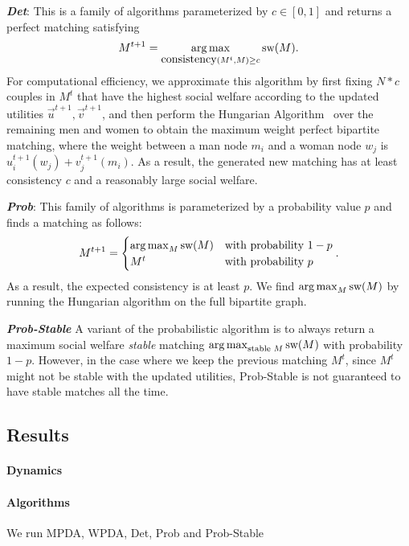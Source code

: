 \textit{\textbf{Det}}: This is a family of algorithms parameterized by $c \in [0, 1]$ and returns a perfect matching satisfying $$M^{t+1} = \operatorname*{arg\,max}_{\mbox{consistency}(M^t, M) \ge c}{\mbox{sw}(M)}.$$
For computational efficiency, we approximate this algorithm by first fixing $N * c$ couples in $M^t$ that have the highest social welfare according to the updated utilities $\overrightarrow{u}^{t+1}, \overrightarrow{v}^{t+1}$, and then perform the Hungarian Algorithm~\cite{Kuhn55thehungarian,Kuhn56thehungarian,Munkres1957Assignment} over the remaining men and women to obtain the maximum weight perfect bipartite matching, where the weight between a man node $m_i$ and a woman node $w_j$ is $u_i^{t+1}(w_j) + v_j^{t+1}(m_i)$. As a result, the generated new matching has at least consistency $c$ and a reasonably large social welfare.

\textit{\textbf{Prob}}: This family of algorithms is parameterized by a probability value $p$ and finds a matching as follows:
$$M^{t+1} = \begin{cases} \operatorname*{arg\,max}_M{\mbox{sw}(M)} &\text{with probability $1-p$}\\ M^t &\text{with probability $p$}\end{cases}.$$
As a result, the expected consistency is at least $p$. We find $\operatorname*{arg\,max}_M{\mbox{sw}(M)}$ by running the Hungarian algorithm on the full bipartite graph.

\textit{\textbf{Prob-Stable}} A variant of the probabilistic algorithm is to always return a maximum social welfare \textit{stable} matching $\operatorname*{arg\,max}_{\text{stable $M$}}{\mbox{sw}(M)}$ with probability $1-p$. However, in the case where we keep the previous matching $M^t$, since $M^t$ might not be stable with the updated utilities, Prob-Stable is not guaranteed to have stable matches all the time.


\subsection{Results}
\paragraph{Dynamics}

\paragraph{Algorithms} We run MPDA, WPDA, Det, Prob and Prob-Stable 

